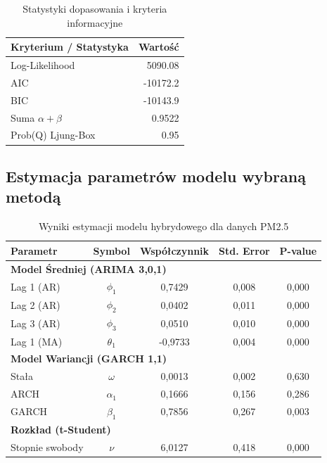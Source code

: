 \documentclass{article}
\begin{document}
\begin{table}[h!]
\centering
\caption{Statystyki dopasowania i kryteria informacyjne}
\label{tab:kryteria}
\begin{tabular}{|l|r|}
\hline
\textbf{Kryterium / Statystyka} & \textbf{Wartość} \\ \hline
Log-Likelihood & 5090.08 \\ \hline
AIC & -10172.2 \\ \hline
BIC & -10143.9 \\ \hline
Suma $\alpha + \beta$ & 0.9522 \\ \hline
Prob(Q) Ljung-Box & 0.95 \\ \hline
\end{tabular}
\end{table}

\subsection{Estymacja parametrów modelu wybraną metodą}

\begin{table}[h!]
\centering
\caption{Wyniki estymacji modelu hybrydowego dla danych PM2.5}
\label{tab:wyniki_modelu}
\begin{tabular}{lcccc}
\hline
\textbf{Parametr} & \textbf{Symbol} & \textbf{Współczynnik} & \textbf{Std. Error} & \textbf{P-value} \\ \hline
\multicolumn{5}{l}{\textbf{Model Średniej (ARIMA 3,0,1)}} \\
Lag 1 (AR) & $\phi_1$ & 0,7429 & 0,008 & 0,000 \\
Lag 2 (AR) & $\phi_2$ & 0,0402 & 0,011 & 0,000 \\
Lag 3 (AR) & $\phi_3$ & 0,0510 & 0,010 & 0,000 \\
Lag 1 (MA) & $\theta_1$ & -0,9733 & 0,004 & 0,000 \\ \hline
\multicolumn{5}{l}{\textbf{Model Wariancji (GARCH 1,1)}} \\
Stała & $\omega$ & 0,0013 & 0,002 & 0,630 \\
ARCH & $\alpha_1$ & 0,1666 & 0,156 & 0,286 \\
GARCH & $\beta_1$ & 0,7856 & 0,267 & 0,003 \\ \hline
\multicolumn{5}{l}{\textbf{Rozkład (t-Student)}} \\
Stopnie swobody & $\nu$ & 6,0127 & 0,418 & 0,000 \\ \hline
\end{tabular}
\end{table}
\end{document}
